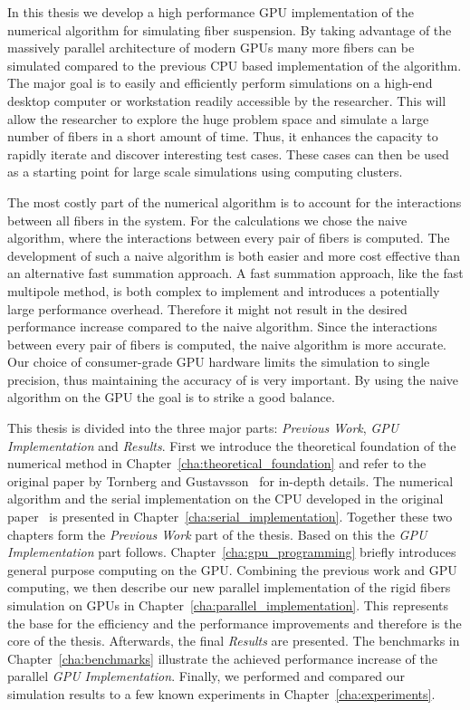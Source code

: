 In this thesis we develop a high performance GPU implementation of the numerical algorithm for simulating fiber suspension. By taking advantage of the massively parallel architecture of modern GPUs many more fibers can be simulated compared to the previous CPU based implementation of the algorithm. The major goal is to easily and efficiently perform simulations on a high-end desktop computer or workstation readily accessible by the researcher. This will allow the researcher to explore the huge problem space and simulate a large number of fibers in a short amount of time. Thus, it enhances the capacity to rapidly iterate and discover interesting test cases. These cases can then be used as a starting point for large scale simulations using computing clusters.

The most costly part of the numerical algorithm is to account for the interactions between all fibers in the system. For the calculations we chose the naive algorithm, where the interactions between every pair of fibers is computed. The development of such a naive algorithm is both easier and more cost effective than an alternative fast summation approach. A fast summation approach, like the fast multipole method, is both complex to implement and introduces a potentially large performance overhead. Therefore it might not result in the desired performance increase compared to the naive algorithm. Since the interactions between every pair of fibers is computed, the naive algorithm is more accurate. Our choice of consumer-grade GPU hardware limits the simulation to single precision, thus maintaining the accuracy of is very important. By using the naive algorithm on the GPU the goal is to strike a good balance.

This thesis is divided into the three major parts: \emph{Previous Work}, \emph{GPU Implementation} and \emph{Results}. First we introduce the theoretical foundation of the numerical method in Chapter~\ref{cha:theoretical_foundation} and refer to the original paper by Tornberg and Gustavsson~\cite{Tornberg2006} for in-depth details. The numerical algorithm and the serial implementation on the CPU developed in the original paper~\cite{Tornberg2006} is presented in Chapter~\ref{cha:serial_implementation}. Together these two chapters form the \emph{Previous Work} part of the thesis. Based on this the \emph{GPU Implementation} part follows. Chapter~\ref{cha:gpu_programming} briefly introduces general purpose computing on the GPU. Combining the previous work and GPU computing, we then describe our new parallel implementation of the rigid fibers simulation on GPUs in Chapter~\ref{cha:parallel_implementation}. This represents the base for the efficiency and the performance improvements and therefore is the core of the thesis. Afterwards, the final \emph{Results} are presented. The benchmarks in Chapter~\ref{cha:benchmarks} illustrate the achieved performance increase of the parallel \emph{GPU Implementation}. Finally, we performed and compared our simulation results to a few known experiments in Chapter~\ref{cha:experiments}.
